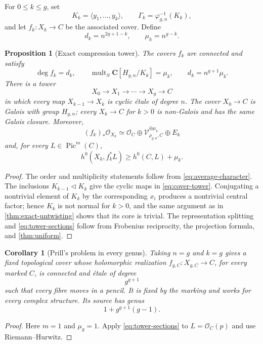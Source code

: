\documentclass[11pt,reqno]{amsart}
\numberwithin{equation}{section}
\newtheorem{proposition}[proposition]{Proposition}
\newtheorem{corollary}[corollary]{Corollary}
\theoremstyle{remark}
\DeclareMathOperator{\Pic}{Pic}
\DeclareMathOperator{\mult}{mult}
\newcommand{\cO}{\mathcal O}
\newcommand{\cV}{\mathcal V}
\newcommand{\bC}{\mathbf C}
\begin{document}
For \(0\leq k\leq g\), set
\[
 K_k=\langle y_1,\ldots,y_k\rangle,\qquad
 \Gamma_k=\varphi_{g,n}^{-1}(K_k),
\]
and let \(f_k\colon X_k\to C\) be the associated cover.  Define
\[
 d_k=n^{2g+1-k},\qquad \mu_k=n^{g-k}.
\tag{2.12}\label{eq:tower-numbers}
\]

\begin{proposition}[Exact compression tower]\label{prop:compression-tower}
The covers \(f_k\) are connected and satisfy
\[
 \deg f_k=d_k,\qquad
 \mult_S\bC[H_{g,n}/K_k]=\mu_k,\qquad
 d_k=n^{g+1}\mu_k.
\tag{2.13}\label{eq:tower-pareto}
\]
There is a tower
\[
 X_0\longrightarrow X_1\longrightarrow\cdots
 \longrightarrow X_g\longrightarrow C
\tag{2.14}\label{eq:cover-tower}
\]
in which every map \(X_{k-1}\to X_k\) is cyclic \'etale of degree \(n\).
The cover \(X_0\to C\) is Galois with group \(H_{g,n}\); every
\(X_k\to C\) for \(k>0\) is non-Galois and has the same Galois closure.
Moreover,
\[
 (f_k)_*\cO_{X_k}
 \simeq\cO_C\oplus
 \cV_{\rho_{g,n},C}^{\oplus\mu_k}\oplus E_k
\tag{2.15}\label{eq:tower-splitting}
\]
and, for every \(L\in\Pic^m(C)\),
\[
 h^0(X_k,f_k^*L)\geq h^0(C,L)+\mu_k.
\tag{2.16}\label{eq:tower-sections}
\]
\end{proposition}

\begin{proof}
The order and multiplicity statements follow from
\eqref{eq:average-character}.  The inclusions
\(K_{k-1}\triangleleft K_k\) give the cyclic maps in
\eqref{eq:cover-tower}.  Conjugating a nontrivial element of \(K_k\) by
the corresponding \(x_i\) produces a nontrivial central factor; hence
\(K_k\) is not normal for \(k>0\), and the same argument as in
\cref{thm:exact-untwisting} shows that its core is trivial.
The representation splitting and \eqref{eq:tower-sections} follow from
Frobenius reciprocity, the projection formula, and
\cref{thm:uniform}.
\end{proof}

\begin{corollary}[Prill's problem in every genus]\label{cor:prill-all-genus}
Taking \(n=g\) and \(k=g\) gives a fixed topological cover whose
holomorphic realization
\(f_{g,C}\colon X_{g,C}\to C\), for every marked \(C\), is connected
and \'etale of degree
\[
 g^{g+1}
\]
such that every fibre moves in a pencil.  It is fixed by the marking and
works for every complex structure.  Its source has genus
\[
 1+g^{g+1}(g-1).
\tag{2.17}\label{eq:prill-source-genus}
\]
\end{corollary}

\begin{proof}
Here \(m=1\) and \(\mu_g=1\).  Apply
\eqref{eq:tower-sections} to \(L=\cO_C(p)\) and use Riemann--Hurwitz.
\end{proof}
\end{document}

